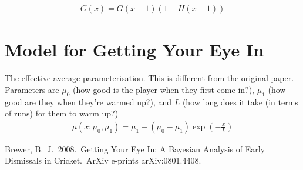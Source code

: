 \documentclass[letterpaper, 11pt]{article}
\begin{document}
\begin{eqnarray}
G(x) = G(x-1)\left(1 - H(x-1)\right)
\end{eqnarray}


\section{Model for Getting Your Eye In}
The effective average parameterisation. This is different from the original
paper. Parameters are $\mu_0$ (how good is the player when they first come
in?), $\mu_1$ (how good are they when they're warmed up?),
and $L$ (how long does it take (in terms of runs) for them to warm up?)
\begin{eqnarray}
\mu(x; \mu_0, \mu_1) = \mu_1 + \left(\mu_0 - \mu_1\right)\exp\left(-\frac{x}{L}\right)
\end{eqnarray}





\begin{thebibliography}{99}
 Brewer, B.~J.\ 2008.\ Getting 
Your Eye In: A Bayesian Analysis of Early Dismissals in Cricket.\ ArXiv 
e-prints arXiv:0801.4408.
\end{thebibliography}
\end{document}

